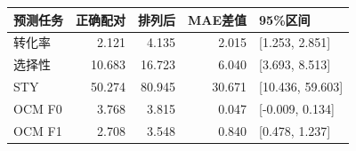 \begin{tabular}{lrrrl}\toprule
预测任务 & 正确配对 & 排列后 & MAE差值 & 95\%区间 \\ \midrule
转化率 & 2.121 & 4.135 & 2.015 & [1.253, 2.851] \\
选择性 & 10.683 & 16.723 & 6.040 & [3.693, 8.513] \\
STY & 50.274 & 80.945 & 30.671 & [10.436, 59.603] \\
OCM F0 & 3.768 & 3.815 & 0.047 & [-0.009, 0.134] \\
OCM F1 & 2.708 & 3.548 & 0.840 & [0.478, 1.237] \\
\bottomrule\end{tabular}
